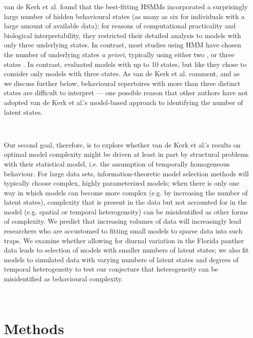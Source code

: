 \documentclass{bmcart}
\begin{document}
van de Kerk et al.\cite{kerk2015hidden} found that the best-fitting HSMMs
incorporated a surprisingly large number of hidden
behavioural states (as many as six for individuals with a large amount
of available data); for reasons of computational 
practicality and biological interpretability, they restricted their
detailed analysis to models with only three underlying states.  In
contrast, most studies using HMM have chosen the
number of underlying states \emph{a priori}, typically using either two
\cite{schliehe-diecks_application_2012,mckellar_using_2014,langrock_flexible_2012,fryxell_multiple_2008}, or three states
\cite{dean2012behavioural,morales_extracting_2004,franke_prediction_2006}. 
In contrast, \cite{dean_behavioural_2013} evaluated models with up to 10
states, but like \cite{kerk2015hidden} they chose to consider only 
models with three states. 
As van de Kerk et al. \cite{kerk2015hidden} comment, and as
we discuss further below, behavioural
repertoires with more than three distinct states are difficult to
interpret --- one possible reason that other authors have not adopted
van de Kerk et al.'s model-based approach to
identifying the number of latent states.

\

Our second goal, therefore, is to explore whether
van de Kerk et al.'s results on optimal
model complexity might be driven at
least in part by structural problems with their statistical
model, i.e. the
assumption of temporally homogeneous behaviour.  For large data sets, 
information-theoretic model selection methods will
typically choose complex, highly parameterized models; when there is
only one way in which models can become more complex (e.g. by
increasing the number of latent states), complexity that is
present in the data but not accounted for in the model (e.g. spatial
or temporal heterogeneity) can be misidentified as other forms of
complexity.  We predict that increasing volumes of data will
increasingly lead researchers who are accustomed to fitting 
small models to sparse data into such traps.  We examine whether
allowing for diurnal variation in the Florida panther data leads to
selection of models with smaller numbers of latent states; we also
fit models to simulated data with varying numbers of latent states
and degrees of temporal heterogeneity to test our conjecture that
heterogeneity can be misidentified as behavioural complexity.

\

\section*{Methods}
\end{document}
